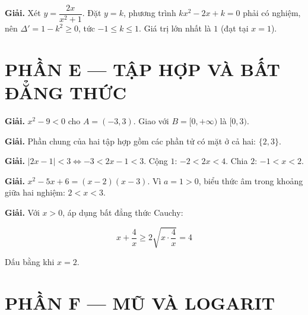 \documentclass[11pt, a4paper]{article}
\begin{document}
\begin{dapan}[31 — Đáp án C]

\textbf{Giải.} Xét $y = \dfrac{2x}{x^2 + 1}$. Đặt $y = k$, phương trình $kx^2 - 2x + k = 0$ phải có nghiệm, nên $\Delta' = 1 - k^2 \ge 0$, tức $-1 \le k \le 1$. Giá trị lớn nhất là $1$ (đạt tại $x = 1$).

\section{PHẦN E — TẬP HỢP VÀ BẤT ĐẲNG THỨC}


\end{dapan}
\vspace{0.3cm}
\begin{dapan}[32 — Đáp án A]

\textbf{Giải.} $x^2 - 9 < 0$ cho $A = (-3, 3)$. Giao với $B = [0, +\infty)$ là $[0, 3)$.


\end{dapan}
\vspace{0.3cm}
\begin{dapan}[33 — Đáp án C]

\textbf{Giải.} Phần chung của hai tập hợp gồm các phần tử có mặt ở cả hai: $\{2, 3\}$.


\end{dapan}
\vspace{0.3cm}
\begin{dapan}[34 — Đáp án D]

\textbf{Giải.} $\lvert 2x - 1 \rvert < 3 \iff -3 < 2x - 1 < 3$. Cộng $1$: $-2 < 2x < 4$. Chia $2$: $-1 < x < 2$.


\end{dapan}
\vspace{0.3cm}
\begin{dapan}[35 — Đáp án C]

\textbf{Giải.} $x^2 - 5x + 6 = (x - 2)(x - 3)$. Vì $a = 1 > 0$, biểu thức âm trong khoảng giữa hai nghiệm: $2 < x < 3$.


\end{dapan}
\vspace{0.3cm}
\begin{dapan}[36 — Đáp án A]

\textbf{Giải.} Với $x > 0$, áp dụng bất đẳng thức Cauchy:

$$x + \dfrac{4}{x} \ge 2\sqrt{x \cdot \dfrac{4}{x}} = 4$$

Dấu bằng khi $x = 2$.

\section{PHẦN F — MŨ VÀ LOGARIT}


\end{dapan}
\end{document}

